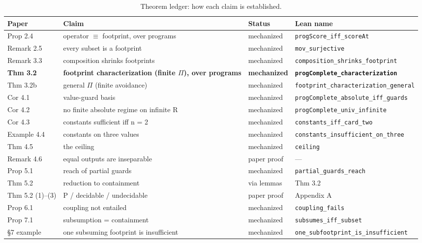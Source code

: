 \documentclass[conference]{IEEEtran}
\theoremstyle{run}
\begin{document}
\begin{table}[!t]\centering\footnotesize
\caption{Theorem ledger: how each claim is established.}
\label{tab:ledger}
\begin{tabular}{L{1.9cm}L{5.4cm}L{1.7cm}L{6.9cm}}
\toprule
Paper & Claim & Status & Lean name \\
\midrule
Prop 2.4 & operator \ensuremath{\equiv} footprint, over programs & mechanized & \texttt{progScore\_iff\_scoreAt} \\
Remark 2.5 & every subset is a footprint & mechanized & \texttt{mov\_surjective} \\
Remark 3.3 & composition shrinks footprints & mechanized & \texttt{composition\_shrinks\_footprint} \\
\textbf{Thm 3.2} & \textbf{footprint characterization (finite \ensuremath{\Pi}), over programs} & \textbf{mechanized} & \textbf{\texttt{progComplete\_characterization}} \\
Thm 3.2b & general \ensuremath{\Pi} (finite avoidance) & mechanized & \texttt{footprint\_characterization\_general} \\
Cor 4.1 & value-guard basis & mechanized & \texttt{progComplete\_absolute\_iff\_guards} \\
Cor 4.2 & no finite absolute regime on infinite R & mechanized & \texttt{progComplete\_univ\_infinite} \\
Cor 4.3 & constants sufficient iff n = 2 & mechanized & \texttt{constants\_iff\_card\_two} \\
Example 4.4 & constants on three values & mechanized & \texttt{constants\_insufficient\_on\_three} \\
Thm 4.5 & the ceiling & mechanized & \texttt{ceiling} \\
Remark 4.6 & equal outputs are inseparable & paper proof & --- \\
Prop 5.1 & reach of partial guards & mechanized & \texttt{partial\_guards\_reach} \\
Thm 5.2 & reduction to containment & via lemmas & Thm 3.2 \\
Thm 5.2 (1)--(3) & P / decidable / undecidable & paper proof & Appendix A \\
Prop 6.1 & coupling not entailed & mechanized & \texttt{coupling\_fails} \\
Prop 7.1 & subsumption = containment & mechanized & \texttt{subsumes\_iff\_subset} \\
\S 7 example & one subsuming footprint is insufficient & mechanized & \texttt{one\_subfootprint\_is\_insufficient} \\

\end{tabular}
\end{table}
\end{document}
